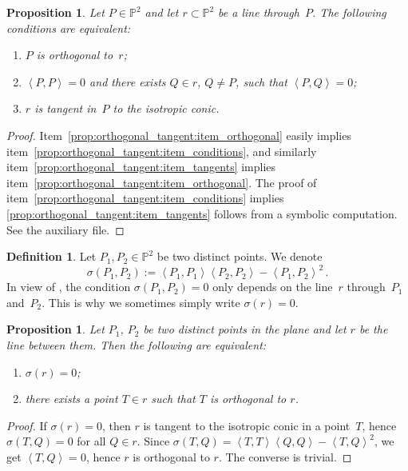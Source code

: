 \documentclass[12pt, a4paper, reqno, captions=tableheading,bibliography=totoc]{scrartcl}
\theoremstyle{plain}
\newtheorem{prop}[lemma]{Proposition}
\theoremstyle{definition}
\newtheorem{definition}[lemma]{Definition}
\newcommand{\p}{\mathbb{P}}
\newcommand{\scl}[2]{\left\langle {#1}, {#2} \right\rangle}
\begin{document}
\begin{prop}
\label{prop:orthogonal_tangent}
  Let $P \in \p^2$ and let $r \subset \p^2$ be a line through~$P$.
  The following conditions are equivalent:
  \begin{enumerate}
  \item \label{prop:orthogonal_tangent:item_orthogonal} $P$ is orthogonal to~$r$;
  \item \label{prop:orthogonal_tangent:item_conditions} $\scl{P}{P} = 0$ and there exists $Q \in r$, $Q \neq P$, such
    that $\scl{P}{Q} = 0$;
  \item \label{prop:orthogonal_tangent:item_tangents} $r$ is tangent in~$P$ to the isotropic conic.
  \end{enumerate}
\end{prop}
\begin{proof}
Item~\ref{prop:orthogonal_tangent:item_orthogonal} easily implies item~\ref{prop:orthogonal_tangent:item_conditions}, and similarly item~\ref{prop:orthogonal_tangent:item_tangents} implies item~\ref{prop:orthogonal_tangent:item_orthogonal}. The proof of item~\ref{prop:orthogonal_tangent:item_conditions} implies \ref{prop:orthogonal_tangent:item_tangents} follows from a symbolic computation. See the auxiliary file.
\end{proof}

\begin{definition}
\label{definition:condition_sigma}
 Let $P_1, P_2 \in \p^2$ be two distinct points.
 We denote
 \[
  \sigma(P_1, P_2) := \scl{P_1}{P_1} \scl{P_2}{P_2} - \scl{P_1}{P_2}^2 \,.
 \]
 In view of , the condition $\sigma(P_1, P_2) = 0$ only depends on the line~$r$ through~$P_1$ and~$P_2$.
 This is why we sometimes simply write $\sigma(r) = 0$.
\end{definition}

\begin{prop}
  Let $P_1$, $P_2$ be two distinct points in the plane and let $r$ be the line between them.
  Then the following are equivalent:
  \begin{enumerate}
  \item $\sigma(r) = 0$;
  \item there exists a point $T \in r$ such that $T$ is orthogonal to $r$.
  \end{enumerate}
\end{prop}
\begin{proof}
  If $\sigma(r) = 0$, then $r$ is tangent to the isotropic conic in a
  point~$T$, hence $\sigma(T, Q) = 0$ for all $Q \in r$.
  Since  $\sigma(T, Q) = \scl{T}{T}\scl{Q}{Q}-\scl{T}{Q}^2$, we get
  $\scl{T}{Q} = 0$, hence $r$ is orthogonal to $r$.
  The converse is trivial.
\end{proof}
\end{document}

